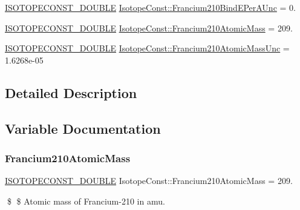 \begin{DoxyCompactItemize}
\mbox{\hyperlink{group___isotope_const-_macros_ga8f45a7272ce02c0b4c65c44636ed719a}{I\+S\+O\+T\+O\+P\+E\+C\+O\+N\+S\+T\+\_\+\+D\+O\+U\+B\+LE}} \mbox{\hyperlink{group___isotope_const-_francium-_fr210_ga4130a48e79d746e18b256fb4ceec2834}{Isotope\+Const\+::\+Francium210\+Bind\+E\+Per\+A\+Unc}} = 0.
\item 
\mbox{\hyperlink{group___isotope_const-_macros_ga8f45a7272ce02c0b4c65c44636ed719a}{I\+S\+O\+T\+O\+P\+E\+C\+O\+N\+S\+T\+\_\+\+D\+O\+U\+B\+LE}} \mbox{\hyperlink{group___isotope_const-_francium-_fr210_gace91c6602045f6f0ee05c2b235cecccc}{Isotope\+Const\+::\+Francium210\+Atomic\+Mass}} = 209.
\item 
\mbox{\hyperlink{group___isotope_const-_macros_ga8f45a7272ce02c0b4c65c44636ed719a}{I\+S\+O\+T\+O\+P\+E\+C\+O\+N\+S\+T\+\_\+\+D\+O\+U\+B\+LE}} \mbox{\hyperlink{group___isotope_const-_francium-_fr210_ga0e9c96bbb140731945fc0f4493e6292e}{Isotope\+Const\+::\+Francium210\+Atomic\+Mass\+Unc}} = 1.\+6268e-\/05
\end{DoxyCompactItemize}


\subsection{Detailed Description}


\subsection{Variable Documentation}
\mbox{\label{group___isotope_const-_francium-_fr210_gace91c6602045f6f0ee05c2b235cecccc}} 
\subsubsection{\texorpdfstring{Francium210\+Atomic\+Mass}{Francium210AtomicMass}}
{\footnotesize\ttfamily \mbox{\hyperlink{group___isotope_const-_macros_ga8f45a7272ce02c0b4c65c44636ed719a}{I\+S\+O\+T\+O\+P\+E\+C\+O\+N\+S\+T\+\_\+\+D\+O\+U\+B\+LE}} Isotope\+Const\+::\+Francium210\+Atomic\+Mass = 209.}

\$ \$ Atomic mass of Francium-\/210 in amu. \mbox{\label{group___isotope_const-_francium-_fr210_ga0e9c96bbb140731945fc0f4493e6292e}} 

